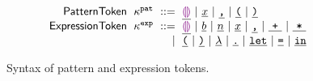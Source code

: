 \begin{figure}
  \vspace{-3px}
  \[
  \arraycolsep=3pt\begin{array}{rlrl}
      \mathsf{PatternToken} & \token^{\pat} & ::= &
        \tokenLit{\shole} ~\vert~
        \tokenLit{\svar{x}} ~\vert~
        \tokenLit{\sprod{}{}} ~\vert~
        \tokenLit{\texttt{(}} ~\vert~
        \tokenLit{\texttt{)}} \\
      \mathsf{ExpressionToken} & \token^{\expr} & ::= &
        \tokenLit{\shole} ~\vert~
        \tokenLit{\sboollit{b}} ~\vert~
        \tokenLit{\snumlit{n}} ~\vert~
        \tokenLit{\svar{x}} ~\vert~
        \tokenLit{\sprod{}{}} ~\vert~
        \tokenLit{\splus{}{}} ~\vert~
        \tokenLit{\smult{}{}} \\
      & & \vert &
        \tokenLit{\texttt{(}} ~\vert~
        \tokenLit{\texttt{)}} ~\vert~
        \tokenLit{\lambda} ~\vert~
        \tokenLit{\texttt{.}} ~\vert~
        \tokenLit{\texttt{let}} ~\vert~
        \tokenLit{\texttt{=}} ~\vert~
        \tokenLit{\texttt{in}}
  \end{array}\]
  \caption{
    Syntax of pattern and expression tokens.
  }
  \label{fig:token-syntax}
\end{figure}